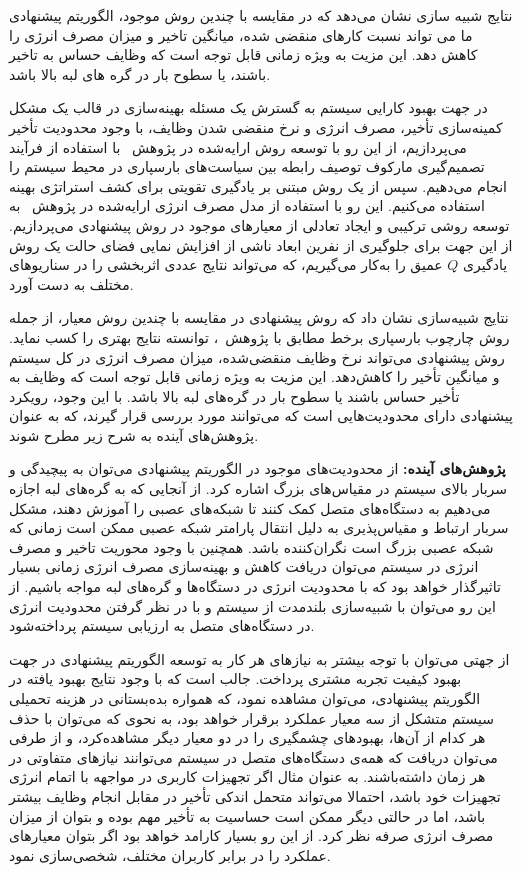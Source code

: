 نتایج شبیه سازی نشان می‌دهد که در مقایسه با چندین روش موجود، الگوریتم پیشنهادی ما می تواند نسبت کارهای منقضی شده، میانگین تاخیر و میزان مصرف انرژی را کاهش دهد. این مزیت به ویژه زمانی قابل توجه است که وظایف حساس به تاخیر باشند، یا سطوح بار در گره های لبه بالا باشد.

در جهت بهبود کارایی سیستم به گسترش یک مسئله بهینه‌سازی در قالب یک مشکل کمینه‌سازی تأخیر، مصرف انرژی و نرخ منقضی شدن وظایف، با وجود محدودیت تأخیر می‌پردازیم، از این رو با توسعه روش ارایه‌شده در پژوهش~\cite{tang2020deep} با استفاده از فرآیند تصمیم‌گیری مارکوف توصیف رابطه بین سیاست‌های بارسپاری در محیط سیستم را انجام می‌دهیم. سپس از یک روش مبتنی بر یادگیری تقویتی برای کشف استراتژی بهینه استفاده می‌کنیم. این رو با استفاده از مدل مصرف انرژی ارایه‌شده در پژوهش~\cite{zhou2021deep} به توسعه روشی ترکیبی و ایجاد تعادلی از معیارهای موجود در روش پیشنهادی می‌پردازیم. از این جهت برای جلوگیری از نفرین ابعاد ناشی از افزایش نمایی فضای حالت یک روش یادگیری $Q$ عمیق را به‌کار می‌گیریم، که می‌تواند نتایج عددی اثربخشی را در سناریوهای مختلف به دست آورد.  

نتایج شبیه‌سازی نشان داد که روش پیشنهادی در مقایسه با چندین روش معیار، از جمله روش چارچوب بارسپاری برخط مطابق با پژوهش~\cite{neto2018uloof}، توانسته نتایج بهتری را کسب نماید. روش پیشنهادی می‌تواند نرخ وظایف منقضی‌شده، میزان مصرف انرژی در کل سیستم و میانگین تأخیر را کاهش‌دهد. این مزیت به ویژه زمانی قابل توجه است که وظایف به تأخیر حساس باشند یا سطوح بار در گره‌های لبه بالا باشد. با این وجود، رویکرد پیشنهادی دارای محدودیت‌هایی است که می‌توانند مورد بررسی قرار گیرند، که به عنوان پژوهش‌های آینده به شرح زیر مطرح شوند.

\textbf{پژوهش‌های آینده:} 
از محدودیت‌های موجود در الگوریتم پیشنهادی می‌توان به پیچیدگی و سربار بالای سیستم در مقیاس‌های بزرگ اشاره کرد. از آنجایی که به گره‌های لبه اجازه می‌دهیم به دستگاه‌های متصل کمک کنند تا شبکه‌های عصبی را آموزش دهند، مشکل سربار ارتباط و مقیاس‌پذیری به دلیل انتقال پارامتر شبکه عصبی ممکن است زمانی که شبکه عصبی بزرگ است نگران‌کننده باشد. همچنین با وجود محوریت تاخیر و مصرف انرژی در سیستم می‌توان دریافت کاهش و بهینه‌سازی مصرف انرژی زمانی بسیار تاثیرگذار خواهد بود که با محدودیت انرژی در دستگاه‌ها و گره‌های لبه مواجه باشیم. از این رو می‌توان با شبیه‌سازی بلندمدت از سیستم و با در نظر گرفتن محدودیت انرژی در دستگاه‌های متصل به ارزیابی سیستم پرداخته‌شود.  


از جهتی می‌توان با توجه بیشتر به نیازهای هر کار به توسعه الگوریتم پیشنهادی در جهت بهبود کیفیت تجربه مشتری پرداخت. جالب است که با وجود نتایج بهبود یافته در الگوریتم پیشنهادی، می‌توان مشاهده نمود، که همواره بده‌بستانی در هزینه تحمیلی سیستم متشکل از سه معیار عملکرد برقرار خواهد بود، به نحوی که می‌توان با حذف هر کدام از آن‌ها، بهبودهای چشمگیری را در دو معیار دیگر مشاهده‌کرد، و از طرفی می‌توان دریافت که همه‌ی دستگاه‌های متصل در سیستم می‌توانند نیازهای متفاوتی در هر زمان داشته‌باشند. به عنوان مثال اگر تجهیزات کاربری در مواجهه با اتمام انرژی تجهیزات خود باشد، احتمالا می‌تواند متحمل اندکی تأخیر در مقابل انجام وظایف بیشتر باشد، اما در حالتی دیگر ممکن است حساسیت به تأخیر مهم بوده و بتوان از میزان مصرف انرژی صرفه نظر کرد. از این رو بسیار کارامد خواهد بود اگر بتوان معیارهای عملکرد را در برابر کاربران مختلف، شخصی‌سازی نمود. 

